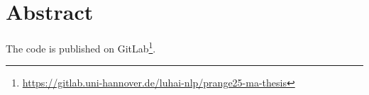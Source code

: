 %
\chapter*{Abstract}
\label{sec:abstract}
\vspace*{-10mm}

The code is published on GitLab\footnote{\url{https://gitlab.uni-hannover.de/luhai-nlp/prange25-ma-thesis}}.




